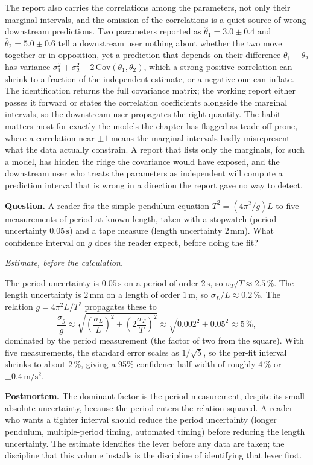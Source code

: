 The report also carries the correlations among the parameters, not
only their marginal intervals, and the omission of the correlations
is a quiet source of wrong downstream predictions. Two parameters
reported as $\hat\theta_1 = 3.0 \pm 0.4$ and
$\hat\theta_2 = 5.0 \pm 0.6$ tell a downstream user nothing about
whether the two move together or in opposition, yet a prediction that
depends on their difference $\theta_1 - \theta_2$ has variance
$\sigma_1^2 + \sigma_2^2 - 2\,\mathrm{Cov}(\theta_1, \theta_2)$, which
a strong positive correlation can shrink to a fraction of the
independent estimate, or a negative one can inflate. The identification
returns the full covariance matrix; the working report either passes
it forward or states the correlation coefficients alongside the
marginal intervals, so the downstream user propagates the right
quantity. The habit matters most for exactly the models the chapter
has flagged as trade-off prone, where a correlation near $\pm 1$
means the marginal intervals badly misrepresent what the data actually
constrain. A report that lists only the marginals, for such a model,
has hidden the ridge the covariance would have exposed, and the
downstream user who treats the parameters as independent will compute
a prediction interval that is wrong in a direction the report gave no
way to detect.

\begin{estimation}
\textbf{Question.} A reader fits the simple pendulum equation
$T^{2} = (4\pi^{2}/g) L$ to five measurements of period at known
length, taken with a stopwatch (period uncertainty
$0.05\,\si{\second}$) and a tape measure (length uncertainty
$2\,\si{\milli\meter}$). What confidence interval on $g$ does the
reader expect, before doing the fit?

\smallskip
\textit{Estimate, before the calculation.}

\smallskip
The period uncertainty is $0.05\,\si{\second}$ on a period of order
$2\,\si{\second}$, so $\sigma_{T}/T \approx 2.5\,\%$. The length
uncertainty is $2\,\si{\milli\meter}$ on a length of order
$1\,\si{\meter}$, so $\sigma_{L}/L \approx 0.2\,\%$. The relation
$g = 4\pi^{2} L / T^{2}$ propagates these to
\[
\frac{\sigma_{g}}{g} \approx \sqrt{\left(\frac{\sigma_{L}}{L}\right)^{2}
  + \left(2 \frac{\sigma_{T}}{T}\right)^{2}}
\approx \sqrt{0.002^{2} + 0.05^{2}} \approx 5\,\%,
\]
dominated by the period measurement (the factor of two from the
square). With five measurements, the standard error scales as
$1/\sqrt{5}$, so the per-fit interval shrinks to about $2\,\%$,
giving a 95\% confidence half-width of roughly $4\,\%$ or
$\pm 0.4\,\si{\meter\per\square\second}$.

\smallskip
\textbf{Postmortem.} The dominant factor is the period
measurement, despite its small absolute uncertainty, because the
period enters the relation squared. A reader who wants a tighter
interval should reduce the period uncertainty (longer pendulum,
multiple-period timing, automated timing) before reducing the
length uncertainty. The estimate identifies the lever before any
data are taken; the discipline that this volume installs is the
discipline of identifying that lever first.
\end{estimation}

